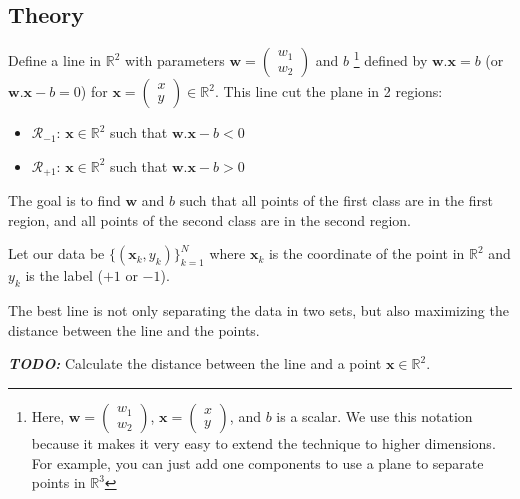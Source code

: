 \documentclass[]{article}
\newcommand{\R}{\mathbb{R}}
\begin{document}
	\subsection{Theory}
	Define a line in $\R^2$ with parameters $\mathbf{w} = \begin{pmatrix} w_1 \\ w_2 \end{pmatrix}$ and $b$
	\footnote{
		Here, $\mathbf{w} = \begin{pmatrix} w_1 \\ w_2 \end{pmatrix}$, $\mathbf{x} = \begin{pmatrix} x \\ y \end{pmatrix}$, and $b$ is a scalar. We use this notation because it makes it very easy to extend the technique to higher dimensions. For example, you can just add one components to use a plane to separate points in $\mathbb{R}^3$
		}
	defined by $\mathbf{w}.\mathbf{x} = b$ (or $\mathbf{w}.\mathbf{x} - b = 0$) for $\mathbf{x} = \begin{pmatrix} x \\ y \end{pmatrix} \in \R^2$.
	This line cut the plane in 2 regions:
	\begin{itemize}
		\item $\mathcal{R}_{-1}$: $\mathbf{x} \in \R^2$ such that $\mathbf{w}.\mathbf{x} - b < 0$
		\item $\mathcal{R}_{+1}$: $\mathbf{x} \in \R^2$ such that $\mathbf{w}.\mathbf{x} - b > 0$
	\end{itemize}
	The goal is to find $\mathbf{w}$ and $b$ such that all points of the first class are in the first region, and all points of the second class are in the second region.
	
	Let our data be $\{ (\mathbf{x}_k, y_k) \}_{k=1}^N$ where $\mathbf{x}_k$ is the coordinate of the point in $\R^2$ and $y_k$ is the label ($+1$ or $-1$).
	
	The best line is not only separating the data in two sets, but also maximizing the distance between the line and the points.
	
	\noindent \textbf{\textit{TODO:}}
	Calculate the distance between the line and a point $\mathbf{x} \in \R^2$.
	
	\vspace{0.5cm}
	
\end{document}
